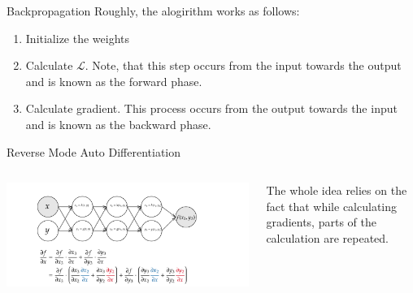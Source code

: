 \begin{frame}
\begin{center}

\end{center}
\end{frame}
\begin{frame}{Backpropagation}
	Roughly, the alogirithm works as follows:
	\begin{enumerate}[$\bullet$]
	\item Initialize the weights\pause
	\item Calculate $\mathcal{L}$. Note, that this step occurs from the input towards the output and is known as the forward phase.
	\item Calculate gradient. This process occurs from the output towards the input and is known as the backward phase.
	\end{enumerate}
  \end{frame}


  \begin{frame}{Reverse Mode Auto Differentiation}
	\begin{columns}[T]
	\begin{column}{0.8\textwidth}
	\begin{center}
		\includegraphics[width=\textwidth]{images/revmodeautodiff.png}
	\end{center}
	\end{column}
	\begin{column}{0.2\textwidth}
	The whole idea relies on the fact that while calculating gradients, parts of the calculation are repeated.
	\end{column}
	\end{columns}
\end{frame}

